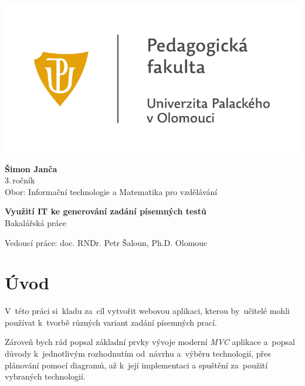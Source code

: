 \documentclass[14pt]{article}
\begin{document}
	\begin{titlepage}
		\begin{center}
            {
            \centering
            \includegraphics[]{./PDF_tisk/UP_logo_PdF-UP_horizont_cz.pdf}
            }
			
			\vspace{3cm}

            {
                \LARGE
                \textbf{Šimon Janča}\\
                3.\,ročník\\[8mm]
                Obor: Informační technologie a Matematika pro vzdělávání
            }

            \vspace{4cm}
			
			{
			    \textbf{\Huge Využití IT ke generování zadání písemných testů}\\[4mm]
			    \Large
			    Bakalářská práce
			}

            \vfill
            
            {
                Vedoucí práce:
                doc. RNDr. Petr Šaloun, Ph.D.
                \hfill
    			Olomouc \the\year{}
            }
			
		\end{center}
	\end{titlepage}
	\tableofcontents
	
	\newpage
	
	\section{Úvod}
    V~této práci si~kladu za~cíl vytvořit webovou aplikaci, kterou by~učitelé mohli používat k~tvorbě různých variant zadání písemných prací.
    
    Zároveň bych rád popsal základní prvky vývoje moderní \emph{MVC} aplikace a~popsal důvody k~jednotlivým rozhodnutím od~návrhu
    a~výběru technologií, přes plánování pomocí diagramů, až k~její implementaci a spuštění za~použití vybraných technologií.
    
\end{document}
